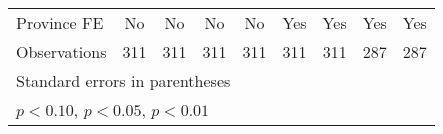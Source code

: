 {\begin{tabular}{l*{8}{c}}
Province FE     &       No         &       No         &       No         &       No         &      Yes         &      Yes         &      Yes         &      Yes         \\
Observations    &      311         &      311         &      311         &      311         &      311         &      311         &      287         &      287         \\
\hline\hline
\multicolumn{9}{l}{\footnotesize Standard errors in parentheses}\\
\multicolumn{9}{l}{\footnotesize \sym{*} \(p<0.10\), \sym{**} \(p<0.05\), \sym{***} \(p<0.01\)}\\
\end{tabular}
}
